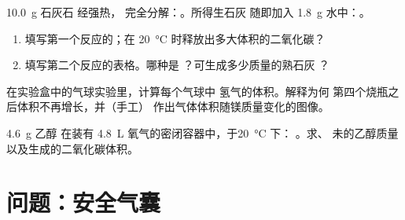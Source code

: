 \begin{exercise}[$\star\star\star$]\label{exo:g10:reaction-progress-table:13}
\qty{10.0}{g} 石灰石  经强热，
完全分解：。所得生石灰 
随即加入 \qty{1.8}{g} 水中：。
\begin{enumerate}
  \item 填写第一个反应的；在
        \qty{20}{\celsius} 时释放出多大体积的二氧化碳？
  \item 填写第二个反应的表格。哪种是
        ？可生成多少质量的熟石灰 ？
\end{enumerate}
\end{exercise}

\begin{exercise}[$\star\star\star$]\label{exo:g10:reaction-progress-table:14}
在实验盒中的气球实验里，计算每个气球中
氢气的体积。解释为何
第四个烧瓶之后体积不再增长，并（手工）
作出气体体积随镁质量变化的图像。
\end{exercise}

\begin{exercise}[$\star\star\star$]\label{exo:g10:reaction-progress-table:15}
\qty{4.6}{g} 乙醇  在装有
\qty{4.8}{L} 氧气的密闭容器中，于\qty{20}{\celsius} 下：
。求、
未的乙醇质量以及生成的二氧化碳体积。
\end{exercise}

\section{问题：安全气囊}

